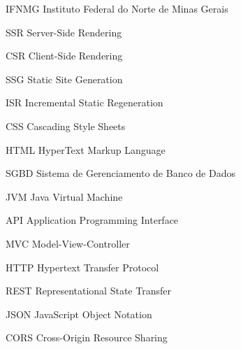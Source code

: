 
\begin{siglas}
  \item[IFNMG] Instituto Federal do Norte de Minas Gerais
  \item[SSR] Server-Side Rendering
  \item[CSR] Client-Side Rendering
  \item[SSG] Static Site Generation
  \item[ISR] Incremental Static Regeneration
  \item[CSS] Cascading Style Sheets
  \item[HTML] HyperText Markup Language
  \item[SGBD] Sistema de Gerenciamento de Banco de Dados
  \item[JVM] Java Virtual Machine
  \item[API] Application Programming Interface
  \item[MVC] Model-View-Controller
  \item[HTTP] Hypertext Transfer Protocol
  \item[REST] Representational State Transfer
  \item[JSON] JavaScript Object Notation
  \item[CORS] Cross-Origin Resource Sharing
\end{siglas}